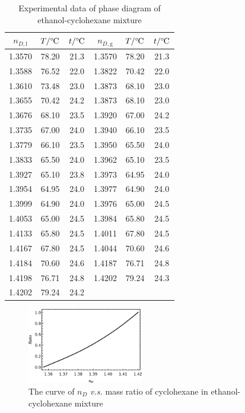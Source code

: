\documentclass[%
 reprint,
 amsmath,amssymb,
 aps,
10.5pt,
]{revtex4-1}
\newcommand{\celsius}{\ensuremath{^\circ\hspace{-0.09em}\mathrm{C}}}
\begin{document}
\begin{table}
\centering
\caption{Experimental data of phase diagram of ethanol-cyclohexane mixture}
\begin{tabular}{ccc|ccc}\hline
$n_{D,\text{l}}$ & $T/\celsius$ & $t/\celsius$ & $n_{D,\text{g}}$ & $T/\celsius$ & $t/\celsius$  \\\hline
 1.3570 & 78.20 & 21.3  & 1.3570 & 78.20 & 21.3 \\
 1.3588 & 76.52 & 22.0  & 1.3822 & 70.42 & 22.0 \\
 1.3610 & 73.48 & 23.0  & 1.3873 & 68.10 & 23.0 \\
 1.3655 & 70.42 & 24.2  & 1.3873 & 68.10 & 23.0 \\
 1.3676 & 68.10 & 23.5  & 1.3920 & 67.00 & 24.2 \\
 1.3735 & 67.00 & 24.0  & 1.3940 & 66.10 & 23.5 \\
 1.3779 & 66.10 & 23.5  & 1.3950 & 65.50 & 24.0 \\
 1.3833 & 65.50 & 24.0  & 1.3962 & 65.10 & 23.5 \\
 1.3927 & 65.10 & 23.8  & 1.3973 & 64.95 & 24.0 \\
 1.3954 & 64.95 & 24.0  & 1.3977 & 64.90 & 24.0 \\
 1.3999 & 64.90 & 24.0  & 1.3976 & 65.00 & 24.5 \\
 1.4053 & 65.00 & 24.5  & 1.3984 & 65.80 & 24.5 \\
 1.4133 & 65.80 & 24.5  & 1.4011 & 67.80 & 24.5 \\
 1.4167 & 67.80 & 24.5  & 1.4044 & 70.60 & 24.6 \\
 1.4184 & 70.60 & 24.6  & 1.4187 & 76.71 & 24.8 \\
 1.4198 & 76.71 & 24.8  & 1.4202 & 79.24 & 24.3 \\
 1.4202 & 79.24 & 24.2 &&&\\\hline
 \end{tabular}
 \label{expdata}
 \end{table}

\begin{figure}
\centering
\includegraphics[width=0.45\textwidth]{figures/ethanol_cyclohexane.eps}
\caption{The curve of $n_D$ \emph{v.s.} mass ratio of cyclohexane in ethanol-cyclohexane mixture}
\label{ndratioline}
\end{figure}
\end{document}
